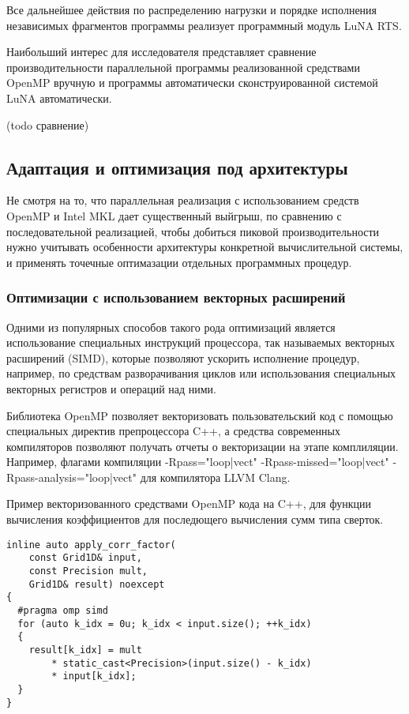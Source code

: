 Все дальнейшее действия по распределению нагрузки и порядке исполнения независимых фрагментов программы реализует
программный модуль LuNA RTS.

Наибольший интерес для исследователя представляет сравнение производительности параллельной программы реализованной средствами OpenMP вручную
и программы автоматически сконструированной системой LuNA автоматически.

(todo сравнение)

\subsection{Адаптация и оптимизация под архитектуры}
Не смотря на то, что параллельная реализация с использованием средств OpenMP и Intel MKL дает существенный выйгрыш,
по сравнению с последовательной реализацией, чтобы добиться пиковой производительности нужно учитывать особенности
архитектуры конкретной вычислительной системы, и применять точечные оптимазации отдельных программных процедур.

\subsubsection{Оптимизации с использованием векторных расширений}

Одними из популярных способов такого рода оптимизаций является использование специальных инструкций процессора,
так называемых векторных расширений (SIMD), которые позволяют ускорить исполнение процедур, например, по средствам
разворачивания циклов или использования специальных векторных регистров и операций над ними.

Библиотека OpenMP позволяет векторизовать пользовательский код с помощью специальных директив препроцессора C++, а средства
современных компиляторов позволяют получать отчеты о векторизации на этапе комплиляции.
Например, флагами компиляции -Rpass="loop|vect" -Rpass-missed="loop|vect" -Rpass-analysis="loop|vect" для компилятора LLVM Clang.

Пример векторизованного средствами OpenMP кода на C++, для функции вычисления коэффициентов для последющего вычисления сумм типа сверток.

\begin{lstlisting}[style={CppCodeStyle}]
inline auto apply_corr_factor(
	const Grid1D& input,
	const Precision mult,
	Grid1D& result) noexcept
{
  #pragma omp simd
  for (auto k_idx = 0u; k_idx < input.size(); ++k_idx)
  {
    result[k_idx] = mult 
    	* static_cast<Precision>(input.size() - k_idx)
    	* input[k_idx];
  }
}
\end{lstlisting}

